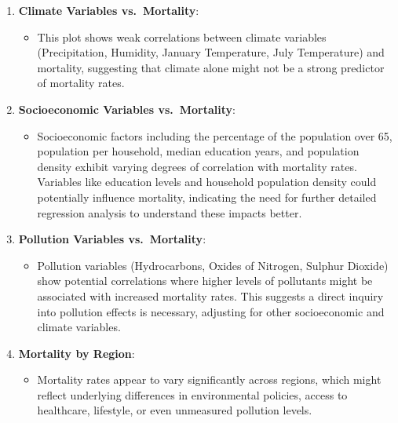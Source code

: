 \documentclass[
]{article}
\providecommand{\tightlist}{%
  \setlength{\itemsep}{0pt}\setlength{\parskip}{0pt}}
\begin{document}
\begin{enumerate}
\def\labelenumi{\arabic{enumi}.}
\tightlist
\item
  \textbf{Climate Variables vs.~Mortality}:

  \begin{itemize}
  \tightlist
  \item
    This plot shows weak correlations between climate variables
    (Precipitation, Humidity, January Temperature, July Temperature) and
    mortality, suggesting that climate alone might not be a strong
    predictor of mortality rates.
  \end{itemize}
\item
  \textbf{Socioeconomic Variables vs.~Mortality}:

  \begin{itemize}
  \tightlist
  \item
    Socioeconomic factors including the percentage of the population
    over 65, population per household, median education years, and
    population density exhibit varying degrees of correlation with
    mortality rates. Variables like education levels and household
    population density could potentially influence mortality, indicating
    the need for further detailed regression analysis to understand
    these impacts better.
  \end{itemize}
\item
  \textbf{Pollution Variables vs.~Mortality}:

  \begin{itemize}
  \tightlist
  \item
    Pollution variables (Hydrocarbons, Oxides of Nitrogen, Sulphur
    Dioxide) show potential correlations where higher levels of
    pollutants might be associated with increased mortality rates. This
    suggests a direct inquiry into pollution effects is necessary,
    adjusting for other socioeconomic and climate variables.
  \end{itemize}
\item
  \textbf{Mortality by Region}:

  \begin{itemize}
  \tightlist
  \item
    Mortality rates appear to vary significantly across regions, which
    might reflect underlying differences in environmental policies,
    access to healthcare, lifestyle, or even unmeasured pollution
    levels.
  \end{itemize}
\end{enumerate}
\end{document}
